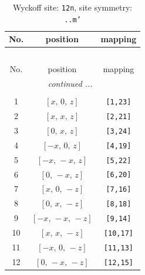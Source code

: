 \documentclass[fleqn,8pt]{jsarticle}
\begin{document}
\begin{longtable}{ccc}
\caption{Wyckoff site: {\tt 12n}, site symmetry: {\tt ..m'}}
 \\
 \hline \hline
No. & position & mapping \\ \hline \endfirsthead

\multicolumn{2}{l}{\tablename\ \thetable{}} \\
 \hline \hline
No. & position & mapping \\ \hline \endhead

 \hline \hline
\multicolumn{2}{r}{\footnotesize\it continued ...} \\ \endfoot

 \hline \hline
\multicolumn{2}{r}{} \\ \endlastfoot

1 & $\left[ x,\, 0,\, z \right]$ & {\tt [1,23]} \\ \hline
2 & $\left[ x,\, x,\, z \right]$ & {\tt [2,21]} \\ \hline
3 & $\left[ 0,\, x,\, z \right]$ & {\tt [3,24]} \\ \hline
4 & $\left[ - x,\, 0,\, z \right]$ & {\tt [4,19]} \\ \hline
5 & $\left[ - x,\, - x,\, z \right]$ & {\tt [5,22]} \\ \hline
6 & $\left[ 0,\, - x,\, z \right]$ & {\tt [6,20]} \\ \hline
7 & $\left[ x,\, 0,\, - z \right]$ & {\tt [7,16]} \\ \hline
8 & $\left[ 0,\, x,\, - z \right]$ & {\tt [8,18]} \\ \hline
9 & $\left[ - x,\, - x,\, - z \right]$ & {\tt [9,14]} \\ \hline
10 & $\left[ x,\, x,\, - z \right]$ & {\tt [10,17]} \\ \hline
11 & $\left[ - x,\, 0,\, - z \right]$ & {\tt [11,13]} \\ \hline
12 & $\left[ 0,\, - x,\, - z \right]$ & {\tt [12,15]} \\
\end{longtable}
\renewcommand{\arraystretch}{1.2}
\end{document}
